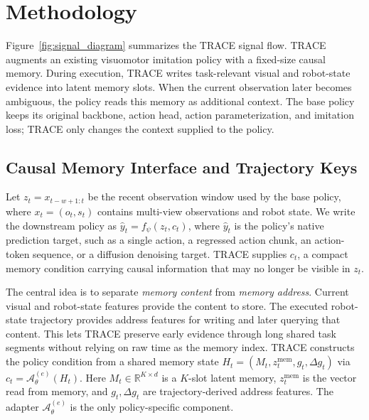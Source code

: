 \documentclass{article}
\begin{document}
\section{Methodology}
\label{sec:method}

Figure~\ref{fig:signal_diagram} summarizes the TRACE signal flow. TRACE augments an existing visuomotor imitation policy with a fixed-size causal memory. During execution, TRACE writes task-relevant visual and robot-state evidence into latent memory slots. When the current observation later becomes ambiguous, the policy reads this memory as additional context. The base policy keeps its original backbone, action head, action parameterization, and imitation loss; TRACE only changes the context supplied to the policy.

\subsection{Causal Memory Interface and Trajectory Keys}
\label{sec:method_memory_interface}

Let $z_t=x_{t-w+1:t}$ be the recent observation window used by the base policy, where $x_t=(o_t,s_t)$ contains multi-view observations and robot state. We write the downstream policy as $\hat y_t=f_{\psi}(z_t,c_t)$, where $\hat y_t$ is the policy's native prediction target, such as a single action, a regressed action chunk, an action-token sequence, or a diffusion denoising target. TRACE supplies $c_t$, a compact memory condition carrying causal information that may no longer be visible in $z_t$.

The central idea is to separate \emph{memory content} from \emph{memory address}. Current visual and robot-state features provide the content to store. The executed robot-state trajectory provides address features for writing and later querying that content. This lets TRACE preserve early evidence through long shared task segments without relying on raw time as the memory index. TRACE constructs the policy condition from a shared memory state $H_t=(M_t,z_t^{\mathrm{mem}},g_t,\Delta g_t)$ via $c_t=\mathcal{A}_{\theta}^{(e)}(H_t)$. Here $M_t\in\mathbb{R}^{K\times d}$ is a $K$-slot latent memory, $z_t^{\mathrm{mem}}$ is the vector read from memory, and $g_t,\Delta g_t$ are trajectory-derived address features. The adapter $\mathcal{A}_{\theta}^{(e)}$ is the only policy-specific component.
\end{document}
